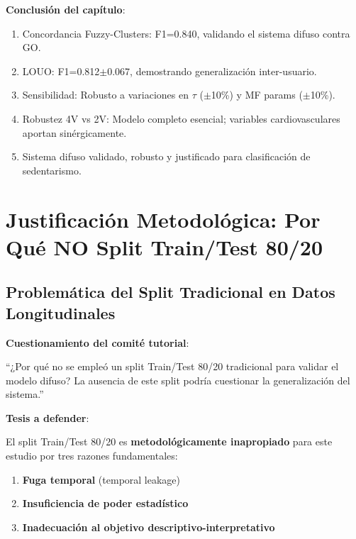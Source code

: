 \documentclass[12pt,letterpaper,twoside]{report}
\begin{document}
\begin{conclusionbox}
\textbf{Conclusión del capítulo}:

\begin{enumerate}[noitemsep]
    \item Concordancia Fuzzy-Clusters: F1=0.840, validando el sistema difuso contra GO.
    \item LOUO: F1=0.812$\pm$0.067, demostrando generalización inter-usuario.
    \item Sensibilidad: Robusto a variaciones en $\tau$ ($\pm$10\%) y MF params ($\pm$10\%).
    \item Robustez 4V vs 2V: Modelo completo esencial; variables cardiovasculares aportan sinérgicamente.
    \item Sistema difuso validado, robusto y justificado para clasificación de sedentarismo.
\end{enumerate}
\end{conclusionbox}

\chapter{Justificación Metodológica: Por Qué NO Split Train/Test 80/20}

\section{Problemática del Split Tradicional en Datos Longitudinales}

\begin{hipotesisbox}
\textbf{Cuestionamiento del comité tutorial}:

``¿Por qué no se empleó un split Train/Test 80/20 tradicional para validar el modelo difuso? La ausencia de este split podría cuestionar la generalización del sistema.''

\textbf{Tesis a defender}:

El split Train/Test 80/20 es \textbf{metodológicamente inapropiado} para este estudio por tres razones fundamentales:
\begin{enumerate}[noitemsep]
    \item \textbf{Fuga temporal} (temporal leakage)
    \item \textbf{Insuficiencia de poder estadístico}
    \item \textbf{Inadecuación al objetivo descriptivo-interpretativo}
\end{enumerate}
\end{hipotesisbox}
\end{document}
